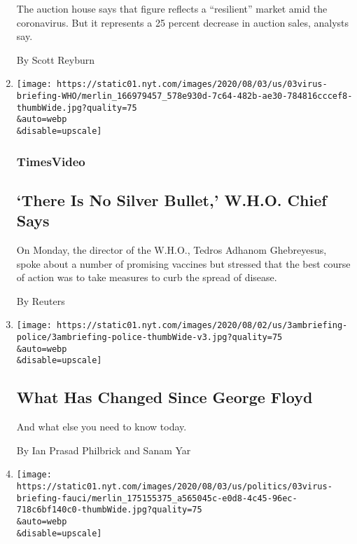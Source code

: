 \begin{enumerate}
  The auction house says that figure reflects a ``resilient'' market
  amid the coronavirus. But it represents a 25 percent decrease in
  auction sales, analysts say.

  By Scott Reyburn
\item
  \href{/video/world/europe/100000007269932/who-coronavirus-briefing.html}{}

  \texttt{[image: https://static01.nyt.com/images/2020/08/03/us/03virus-briefing-WHO/merlin\_166979457\_578e930d-7c64-482b-ae30-784816cccef8-thumbWide.jpg?quality=75\\\&auto=webp\\\&disable=upscale]}

  \hypertarget{timesvideo}{%
  \subsubsection{TimesVideo}\label{timesvideo}}

  \hypertarget{there-is-no-silver-bullet-who-chief-says}{%
  \subsection{`There Is No Silver Bullet,' W.H.O. Chief
  Says}\label{there-is-no-silver-bullet-who-chief-says}}

  On Monday, the director of the W.H.O., Tedros Adhanom Ghebreyesus,
  spoke about a number of promising vaccines but stressed that the best
  course of action was to take measures to curb the spread of disease.

  By Reuters
\item
  \href{/2020/08/03/briefing/coronavirus-vaccine-tropical-storm-isaias-tiktok-your-monday-briefing.html}{}

  \texttt{[image: https://static01.nyt.com/images/2020/08/02/us/3ambriefing-police/3ambriefing-police-thumbWide-v3.jpg?quality=75\\\&auto=webp\\\&disable=upscale]}

  \hypertarget{what-has-changed-since-george-floyd}{%
  \subsection{What Has Changed Since George
  Floyd}\label{what-has-changed-since-george-floyd}}

  And what else you need to know today.

  By Ian Prasad Philbrick and Sanam Yar
\item
  \href{/2020/08/03/world/coronavirus-covid-19.html}{}

  \texttt{[image: https://static01.nyt.com/images/2020/08/03/us/politics/03virus-briefing-fauci/merlin\_175155375\_a565045c-e0d8-4c45-96ec-718c6bf140c0-thumbWide.jpg?quality=75\\\&auto=webp\\\&disable=upscale]}


\end{enumerate}
